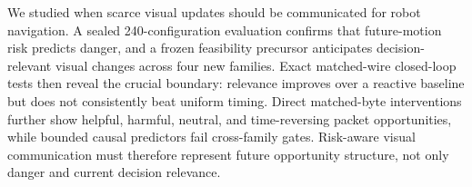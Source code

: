 \documentclass[letterpaper,10pt,conference]{ieeeconf}
\begin{document}
We studied when scarce visual updates should be communicated for robot
navigation. A sealed 240-configuration evaluation confirms that future-motion
risk predicts danger, and a frozen feasibility precursor anticipates
decision-relevant visual changes across four new families. Exact matched-wire
closed-loop tests then reveal the crucial boundary: relevance improves over a
reactive baseline but does not consistently beat uniform timing. Direct
matched-byte interventions further show helpful, harmful, neutral, and
time-reversing packet opportunities, while bounded causal predictors fail
cross-family gates. Risk-aware visual communication must therefore represent
future opportunity structure, not only danger and current decision relevance.



\end{document}
